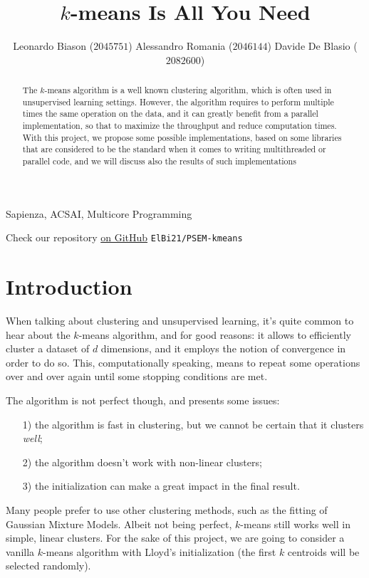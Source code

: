 \documentclass[11pt, journal]{IEEEtran}
\title{$k$-means Is All You Need}
\author{Leonardo Biason ($2045751$) \quad Alessandro Romania ($2046144$) \quad Davide De Blasio ($2082600$)}
\newcommand{\nwl}{

\medskip

}
\begin{document}
\maketitle

\begin{abstract}
    The $k$-means algorithm is a well known clustering algorithm, which is often used in unsupervised learning settings. However, the algorithm requires to perform multiple times the same operation on the data, and it can greatly benefit from a parallel implementation, so that to maximize the throughput and reduce computation times. With this project, we propose some possible implementations, based on some libraries that are considered to be the  standard when it comes to writing multithreaded or parallel code, and we will discuss also the results of such implementations
\end{abstract}

\begin{keywords}
    Sapienza, ACSAI, Multicore Programming
\end{keywords}
\nwl
\begin{tcolorbox}[colback = Purple!20, colframe = Purple!40]
    \begin{center}
         Check our repository \href{https://www.github.com/ElBi21/PSEM-kmeans}{on GitHub}
        \verb|ElBi21/PSEM-kmeans|
    \end{center}
\end{tcolorbox}

\section{Introduction}

When talking about clustering and unsupervised learning, it's quite common to hear about the $k$-means algorithm, and for good reasons: it allows to efficiently cluster a dataset of $d$ dimensions, and it employs the notion of convergence in order to do so. This, computationally speaking, means to repeat some operations over and over again until some stopping conditions are met.

\nwl

The algorithm is not perfect though, and presents some issues:
\begin{itemize}
    \item [1)] the algorithm is fast in clustering, but we cannot be certain that it clusters \textit{well};
    \item [2)] the algorithm doesn't work with non-linear clusters;
    \item [3)] the initialization can make a great impact in the final result.
\end{itemize}
\nwl
Many people prefer to use other clustering methods, such as the fitting of Gaussian Mixture Models. Albeit not being perfect, $k$-means still works well in simple, linear clusters. For the sake of this project, we are going to consider a vanilla $k$-means algorithm with Lloyd's initialization (the first $k$ centroids will be selected randomly).
\end{document}
